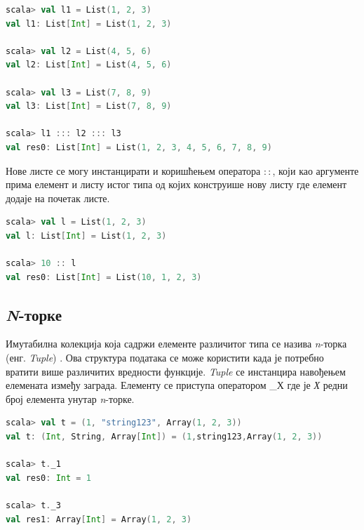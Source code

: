 \documentclass[12pt,oneside]{memoir}
\begin{document}
\begin{lstlisting}[language=Scala, caption={Спајање листи}, label={lst:scala_coll_lists_new_list}]
scala> val l1 = List(1, 2, 3)
val l1: List[Int] = List(1, 2, 3)

scala> val l2 = List(4, 5, 6)
val l2: List[Int] = List(4, 5, 6)

scala> val l3 = List(7, 8, 9)
val l3: List[Int] = List(7, 8, 9)

scala> l1 ::: l2 ::: l3
val res0: List[Int] = List(1, 2, 3, 4, 5, 6, 7, 8, 9)
\end{lstlisting}

Нове листе се могу инстанцирати и коришћењем оператора $::$, који као аргументе прима елемент и листу истог типа од којих конструише нову листу где елемент додаје на почетак листе.

\begin{lstlisting}[language=Scala, caption={Пример оператора ::}, label={lst:scala_coll_lists_head_op}]
scala> val l = List(1, 2, 3)
val l: List[Int] = List(1, 2, 3)

scala> 10 :: l
val res0: List[Int] = List(10, 1, 2, 3)
\end{lstlisting}



\subsection{\textit{N}-торке}
\label{subsec:scala_tuple}

Имутабилна колекција која садржи елементе различитог типа се назива \textit{n}-торка (енг. \textit{Tuple}) \cite{scala_prog}. Ова структура података се може користити када је потребно вратити више различитих вредности функције. \textit{Tuple} се инстанцира навођењем елемената између заграда. Елементу се приступа оператором \_Х где је \textit{Х} редни број елемента унутар \textit{n}-торке.

\begin{lstlisting}[language=Scala, caption={\textit{N}-торка у Скали}, label={lst:scala_coll_tuple_example}]
scala> val t = (1, "string123", Array(1, 2, 3))
val t: (Int, String, Array[Int]) = (1,string123,Array(1, 2, 3))

scala> t._1
val res0: Int = 1

scala> t._3
val res1: Array[Int] = Array(1, 2, 3)
\end{lstlisting}
\end{document}
